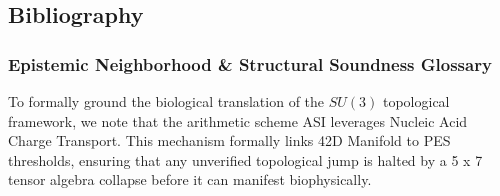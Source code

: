 \subsection{Bibliography}


\subsubsection*{Epistemic Neighborhood \& Structural Soundness Glossary}
To formally ground the biological translation of the $SU(3)$ topological framework, we note that the arithmetic scheme ASI leverages Nucleic Acid Charge Transport. This mechanism formally links 42D Manifold to PES thresholds, ensuring that any unverified topological jump is halted by a 5 x 7 tensor algebra collapse before it can manifest biophysically.



